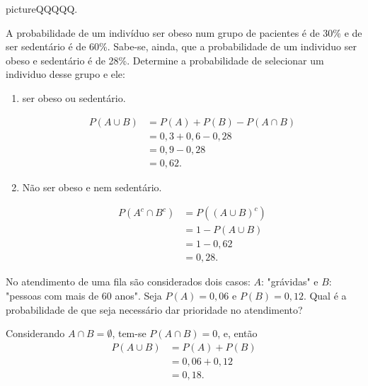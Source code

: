\documentclass[11pt,fleqn]{book}
\numberwithin{mpicture}{chapter}
\numberwithin{mtable}{chapter}
\numberwithin{mframe}{chapter}
\begin{document}
\begin{sidepicture}{0cm}{picture}{QQQQQ.}
	\label{picture:eventos_mutuamente_exclusivos}
\end{sidepicture}

\begin{example}
	A probabilidade de um indivíduo ser obeso num grupo de pacientes é de 30\% e de ser sedentário é de 60\%. Sabe-se, ainda, que a probabilidade de um individuo ser obeso e sedentário é de 28\%. Determine a probabilidade de selecionar um individuo desse grupo e ele:
	
	\begin{enumerate}[label=\alph*)]
		\item ser obeso ou sedentário.
		
			\begin{align*}
				P(A\cup B)&=P(A)+P(B)-P(A\cap B)\\
						  &=0,3+0,6-0,28\\
						  &=0,9-0,28\\
						  &=0,62\text{.}
			\end{align*}
			
		\item Não ser obeso e nem sedentário.
		
			\begin{align*}
				P(A^c\cap B^c)&=P((A\cup B)^c)\\
							  &=1-P(A\cup B)\\
							  &=1-0,62\\
							  &=0,28\text{.}
			\end{align*}
	\end{enumerate}
\end{example}

\begin{example}
	No atendimento de uma fila são considerados dois casos: $A$: "grávidas" e $B$: "pessoas com mais de 60 anos". Seja $P(A)=0,06$ e $P(B)=0,12$. Qual é a probabilidade de que seja necessário dar prioridade no atendimento?
	
	Considerando $A\cap B=\emptyset$, tem-se $P(A\cap B)=0$, e, então
	\begin{align*}
		P(A\cup B)&=P(A)+P(B)\\
				  &=0,06+0,12\\
				  &=0,18\text{.}
	\end{align*}
\end{example}
\end{document}
